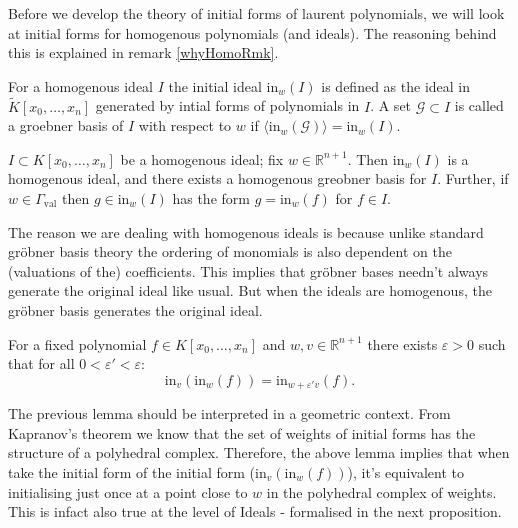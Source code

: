 \par Before we develop the theory of initial forms of laurent polynomials, we will look at initial forms for homogenous polynomials (and ideals). 
The reasoning behind this is explained in remark \ref{whyHomoRmk}.

\begin{definition}
    For a homogenous ideal $I$ the initial ideal $\text{in}_{w}(I)$ is defined as the ideal in $\tilde{K}[x_0,\dots,x_n]$ generated by intial forms of polynomials in $I$. 
    A set $\mathcal{G} \subset I$ is called a groebner basis of $I$ with respect to $w$ if $\langle\text{in}_{w}\left(\mathcal{G}\right)\rangle = \text{in}_{w}(I)$.
\end{definition}

    \begin{lemma}
        $I \subset K[x_0,\dots, x_n]$ be a homogenous ideal; fix $w\in \mathbb{R}^{n+1}$. 
        Then $\text{in}_{w}(I)$ is a homogenous ideal, and there exists a homogenous greobner basis for $I$. 
        Further, if $w \in \Gamma_{\text{val}}$ then $g \in \text{in}_{w}(I)$ has the form $g = \text{in}_{w}(f)$ for $f \in I$.
    \end{lemma}

    \begin{remark}
        \label{whyHomoRmk}
        The reason we are dealing with homogenous ideals is because unlike standard gr\"{o}bner basis theory the ordering of monomials is also dependent on the (valuations of the) coefficients. 
        This implies that gr\"{o}bner bases needn't always generate the original ideal like usual. But when the ideals are homogenous, the gr\"{o}bner basis generates the original ideal.
    \end{remark}

    \begin{lemma}
        For a fixed polynomial $f \in K[x_0,\dots,x_n]$ and $w,v \in \mathbb{R}^{n+1}$ there exists $\varepsilon >0$ such that for all $0<\varepsilon ' < \varepsilon$: 
        \begin{equation*}
            \text{in}_{v}(\text{in}_{w}(f)) = \text{in}_{w + \varepsilon 'v}(f).
        \end{equation*}
    \end{lemma}
    \begin{remark}
    The previous lemma should be interpreted in a geometric context.
    From Kapranov's theorem we know that the set of weights of initial forms has the structure of a polyhedral complex. 
    Therefore, the above lemma implies that when take the initial form of the initial form ($\text{in}_{v}(\text{in}_{w}(f))$), it's equivalent to initialising just once at a point close to $w$ in the polyhedral complex of weights.
    This is infact also true at the level of Ideals - formalised in the next proposition.
    \end{remark}

